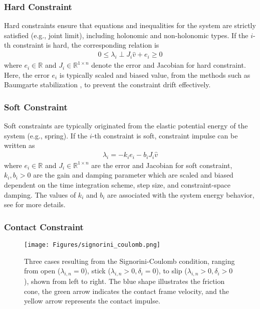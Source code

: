 \documentclass[lettersize,journal]{IEEEtran}
\begin{document}
\subsubsection{Hard Constraint}

Hard constraints ensure that equations and inequalities for the system are strictly satisfied (e.g., joint limit), including holonomic and non-holonomic types. If the $i$-th constraint is hard, the corresponding relation is
\begin{align} \label{eq:hardcon}
    0 \le \lambda_i \perp J_i\hat{v} + e_i \ge 0
\end{align}
where $e_i\in\mathbb{R}$ and $J_i\in\mathbb{R}^{1\times n}$ denote the error and Jacobian for hard constraint.
Here, the error $e_i$ is typically scaled and biased value, from the methods such as Baumgarte stabilization \cite{baumgarte1972stabilization}, to prevent the constraint drift effectively.

\subsubsection{Soft Constraint}
Soft constraints are typically originated from the elastic potential energy of the system (e.g., spring).
If the $i$-th constraint is soft, constraint impulse can be written as
\begin{align} \label{eq:softcon}
    \lambda_i = -k_i e_i - b_i J_i\hat{v}
\end{align}
where $e_i\in\mathbb{R}$ and $J_i\in\mathbb{R}^{1\times n}$ are the error and Jacobian for soft constraint, $k_i,b_i>0$ are the gain and damping parameter which are scaled and biased dependent on the time integration scheme, step size, and constraint-space damping. 
The values of $k_i$ and $b_i$ are associated with the system energy behavior, see \cite{andrews2017geometric,kim2017haptic} for more details.


\subsubsection{Contact Constraint}

\begin{figure}[t]
\centering
\texttt{[image: Figures/signorini\_coulomb.png]}
\caption{Three cases resulting from the Signorini-Coulomb condition, ranging from open ($\lambda_{i,n}=0$), stick ($\lambda_{i,n}>0, \delta_i=0$), to slip ($\lambda_{i,n}>0, \delta_i>0$), shown from left to right. 
The blue shape illustrates the friction cone, the green arrow indicates the contact frame velocity, and the yellow arrow represents the contact impulse.}
\label{fig:signorini_coulomb}
\end{figure}
\end{document}
